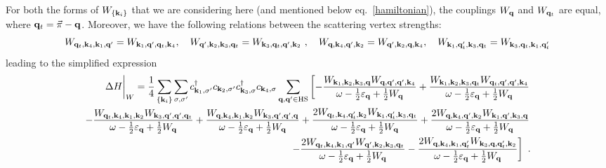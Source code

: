 \documentclass{revtex4-2}
\begin{document}
For both the forms of \(W_{\left\{ {\bf k}_i \right\} }\) that we are considering here (and mentioned below eq.~\ref{hamiltonian}), the couplings \(W_{{\bf q}}\) and \(W_{{\bf q}_t}\) are equal, where \({\bf q}_t = \vec \pi - {\bf q}\). Moreover, we have the following relations between the scattering vertex strengths:
\begin{equation}\begin{aligned}
	W_{{\bf q}_t,{\bf k}_4, {\bf k}_1, {\bf q}^\prime} = W_{{\bf k}_1, {\bf q}^\prime, {\bf q}_t,{\bf k}_4}, \quad W_{{\bf q}^\prime, {\bf k}_2, {\bf k}_3, {\bf q}_t} = W_{{\bf k}_3, {\bf q}_t, {\bf q}^\prime, {\bf k}_2}~,\quad W_{{\bf q},{\bf k}_4, {\bf q}^\prime, {\bf k}_2}=W_{{\bf q}^\prime, {\bf k}_2,{\bf q},{\bf k}_4},\quad W_{{\bf k}_1,{\bf q}_t^\prime, {\bf k}_3, {\bf q}_t}=W_{{\bf k}_3, {\bf q}_t,{\bf k}_1,{\bf q}_t^\prime}
\end{aligned}\end{equation}
leading to the simplified expression
\begin{equation}\begin{aligned}
	\Delta H\bigg|_{W} = \frac{1}{4}\sum_{\left\{ {\bf k}_i \right\}}\sum_{\sigma,\sigma^\prime} c^\dagger_{{\bf k}_1,\sigma^\prime}c_{{\bf k}_2,\sigma^\prime}c^\dagger_{{\bf k}_3,\sigma} c_{{\bf k}_4,\sigma} \sum_{{\bf q}, {\bf q}^\prime \in \text{HS}}\left[-\frac{W_{{\bf k}_1,{\bf k}_2,{\bf k}_3,{\bf q}} W_{{\bf q},{{\bf q}^\prime},{{\bf q}^\prime},{\bf k}_4}}{\omega - \frac{1}{2}\varepsilon_{{\bf q}} + \frac{1}{2}W_{{\bf q}}} + \frac{W_{{\bf k}_1,{\bf k}_2,{\bf k}_3,{\bf q}_t} W_{{\bf q}_t,{{\bf q}^\prime},{{\bf q}^\prime},{\bf k}_4}}{\omega - \frac{1}{2}\varepsilon_{{\bf q}} + \frac{1}{2}W_{{\bf q}}} \right.\\
\left.- \frac{W_{{\bf q}_t,{\bf k}_4,{\bf k}_1,{\bf k}_2} W_{{\bf k}_3,{{\bf q}^\prime},{{\bf q}^\prime},{\bf q}_t}}{\omega - \frac{1}{2}\varepsilon_{{\bf q}} + \frac{1}{2}W_{{\bf q}}}
 + \frac{W_{{\bf q},{\bf k}_4,{\bf k}_1,{\bf k}_2} W_{{\bf k}_3,{{\bf q}^\prime},{{\bf q}^\prime},{\bf q}}}{\omega - \frac{1}{2}\varepsilon_{{\bf q}} + \frac{1}{2}W_{{\bf q}}}
 + \frac{2W_{{\bf q}_t,{\bf k}_4, {\bf q}_t^\prime, {\bf k}_2} W_{{\bf k}_1,{\bf q}_t^\prime, {\bf k}_3, {\bf q}_t}}{\omega - \frac{1}{2}\varepsilon_{{\bf q}} + \frac{1}{2}W_{{\bf q}}} + \frac{2W_{{\bf q},{\bf k}_4, {\bf q}^\prime, {\bf k}_2} W_{{\bf k}_1,{\bf q}^\prime, {\bf k}_3, {\bf q}}}{\omega - \frac{1}{2}\varepsilon_{{\bf q}} + \frac{1}{2}W_{{\bf q}}}\right.\\
\left. - \frac{2W_{{\bf q}_t,{\bf k}_4, {\bf k}_1, {\bf q}^\prime} W_{{\bf q}^\prime, {\bf k}_2, {\bf k}_3, {\bf q}_t}}{\omega - \frac{1}{2}\varepsilon_{{\bf q}}  + \frac{1}{2}W_{{\bf q}}} - \frac{2W_{{\bf q},{\bf k}_4, {\bf k}_1, {\bf q}_t^\prime} W_{{\bf k}_3, {\bf q}, {\bf q}_t^\prime, {\bf k}_2}}{\omega - \frac{1}{2}\varepsilon_{{\bf q}}  + \frac{1}{2}W_{{\bf q}}}\right]~.
\end{aligned}\end{equation}
\end{document}
